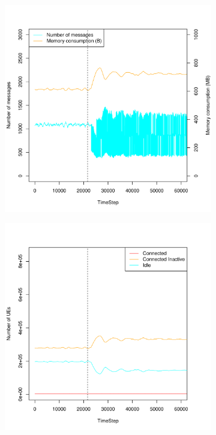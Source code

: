 \documentclass[a4j]{ujarticle}
\begin{document}
\begin{figure}[htbp]
\begin{subfigure}{0.49\hsize}
   \label{subfig:scenario_6_idleTimer_86400_345600_1-5_0_0_0_ideal}
 \end{subfigure}
 \par\bigskip %
 \begin{subfigure}{0.49\hsize}
   \centering
   \includegraphics[width=1.0\hsize]{scenario_6_signaling_and_memoryload_vs_timeStep_86400_345600_1-5_0_0_0_ideal.pdf}
   \label{subfig:scenario_6_signaling_and_memoryload_vs_timeStep_86400_345600_1-5_0_0_0_ideal}
 \end{subfigure}
 \begin{subfigure}{0.49\hsize}
   \centering
   \includegraphics[width=1.0\hsize]{scenario_6_stateBreakdown_86400_345600_1-5_0_0_0_ideal.pdf}

\end{subfigure}
\end{figure}
\end{document}

